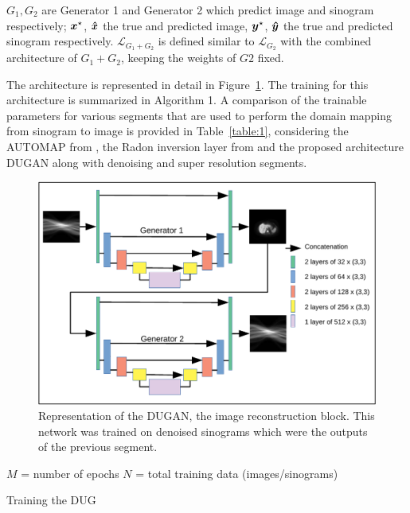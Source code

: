 $G_{1},G_{2}$ are Generator 1 and Generator 2 which predict image and sinogram respectively; $\bm{x}^\star$, $\bm{\hat{x}}$ the true and predicted image, $\bm{y}^\star$, $\bm{\hat{y}}$ the true and predicted sinogram respectively. $\mathcal{L}_{G_1+G_2}$ is defined similar to $\mathcal{L}_{G_2}$ with the combined architecture of $G_{1}+G_{2}$, keeping the weights of $G2$ fixed. 

The architecture is represented in detail in Figure~\ref{fig:dugan}. The training for this architecture is summarized in Algorithm 1. A comparison of the trainable parameters for various segments that are used to perform the domain mapping from sinogram to image is provided in Table~\ref{table:1}, considering the AUTOMAP from \cite{zhu2018image}, the Radon inversion layer from \cite{whiteley2019direct} and the proposed architecture \ac{DUGAN} along with denoising and super resolution segments.

\begin{figure}[!htbp]
	\centering
	\includegraphics[width=1.0\linewidth]{./Figures/dugan-crop.pdf}
	\caption{Representation of the \ac{DUGAN}, the image reconstruction block. This network was trained on denoised sinograms which were the outputs of the previous segment.}
	\label{fig:dugan}
\end{figure}


\begin{algorithm}
	\SetAlgoLined
	$M$ = number of epochs \;
	$N$ = total training data (images/sinograms) \;
	\caption{Training the DUG}
	\label{alg:1}
\end{algorithm}


